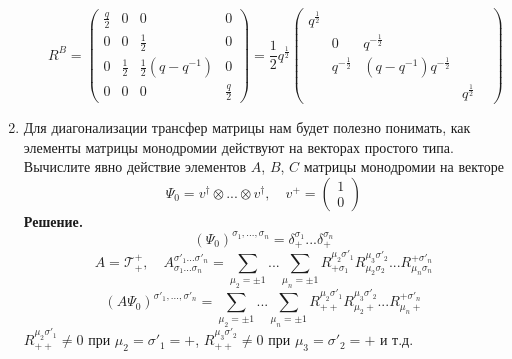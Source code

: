 \documentclass[12pt]{article}
\theoremstyle{definition}
\begin{document}
\begin{enumerate}
\begin{itemize}
\begin{equation}
            \boxed{R^B=\begin{pmatrix}
                \frac{q}{2} & 0 & 0 & 0\\
                0 & 0 & \frac{1}{2} & 0\\
                0 & \frac{1}{2} & \frac{1}{2}(q-q^{-1}) & 0\\
                0 & 0 & 0 & \frac{q}{2}
            \end{pmatrix}=\frac{1}{2}q^{\frac{1}{2}}\begin{pmatrix}
                q^\frac{1}{2}&&&\\
                &0&q^{-\frac{1}{2}}&&\\
                &q^{-\frac{1}{2}} & (q-q^{-1})q^{-\frac{1}{2}}&\\
                &&&q^{\frac{1}{2}}
            \end{pmatrix}}
        \end{equation}
    \end{itemize}
    \item Для диагонализации трансфер матрицы нам будет полезно понимать, как элементы матрицы монодромии действуют на векторах простого типа. Вычислите явно действие элементов $A$, $B$, $C$ матрицы монодромии на векторе
    \begin{equation}
        \Psi_0=v^\dagger\otimes...\otimes v^\dagger,\quad v^+=\begin{pmatrix}
            1\\
            0
        \end{pmatrix}
    \end{equation}
    \textbf{Решение.}\\
    \begin{equation}
        (\Psi_0)^{\sigma_1,...,\sigma_n}=\delta^{\sigma_1}_+...\delta^{\sigma_n}_+
    \end{equation}
    \begin{equation}
        A=\mathcal{T}^+_+,\quad A^{\sigma'_1...\sigma'_n}_{\sigma_1...\sigma_n}=\sum\limits_{\mu_2=\pm1}...\sum\limits_{\mu_n=\pm1}R^{\mu_2\sigma'_1}_{+\sigma_1}R^{\mu_3\sigma'_2}_{\mu_2\sigma_2}...R^{+\sigma'_n}_{\mu_n\sigma_n}
    \end{equation}
    \begin{equation}
        (A\Psi_0)^{\sigma'_1,...,\sigma'_n}=\sum\limits_{\mu_2=\pm1}...\sum\limits_{\mu_n=\pm1}R^{\mu_2\sigma'_1}_{++}R^{\mu_3\sigma'_2}_{\mu_2+}...R^{+\sigma'_n}_{\mu_n+}
    \end{equation}
    $R^{\mu_2\sigma'_1}_{++}\neq0$ при $\mu_2=\sigma'_1=+$, $R^{\mu_3\sigma'_2}_{++}\neq0$ при $\mu_3=\sigma'_2=+$ и т.д.

\end{enumerate}
\end{document}

